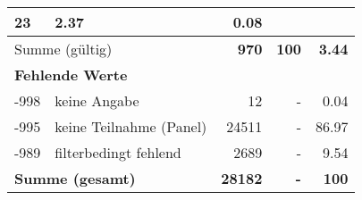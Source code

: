\begin{longtable}{lXrrr}
       \num{23} &
       \num[round-mode=places,round-precision=2]{2.37} &
         \num[round-mode=places,round-precision=2]{0.08} \\
     \midrule
     \multicolumn{2}{l}{Summe (gültig)} &
       \textbf{\num{970}} &
     \textbf{100} &
       \textbf{\num[round-mode=places,round-precision=2]{3.44}} \\
     \multicolumn{5}{l}{\textbf{Fehlende Werte}}\\
       -998 &
       keine Angabe &
         \num{12} &
        - &
         \num[round-mode=places,round-precision=2]{0.04} \\
       -995 &
       keine Teilnahme (Panel) &
         \num{24511} &
        - &
         \num[round-mode=places,round-precision=2]{86.97} \\
       -989 &
       filterbedingt fehlend &
         \num{2689} &
        - &
         \num[round-mode=places,round-precision=2]{9.54} \\
     \midrule
     \multicolumn{2}{l}{\textbf{Summe (gesamt)}} &
          \textbf{\num{28182}} &
        \textbf{-} &
        \textbf{100} \\
     \bottomrule
     \end{longtable}
     
